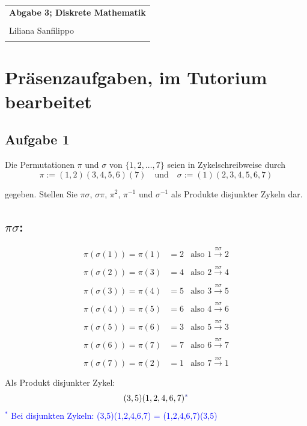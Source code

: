 \documentclass{article} %
\newcommand{\titulo}{Abgabe 3; Diskrete Mathematik}
\newcommand{\nombre}{Liliana Sanfilippo}
\begin{document}
\begin{tabular}{p{12cm}}
{{\Large\bf\titulo}}\\
\vspace{0.2cm}\\
 {\large\nombre}\\
 \vspace{0.2cm}\\   
\end{tabular}
\section{Präsenzaufgaben, im Tutorium bearbeitet}
\subsection{Aufgabe 1}
Die Permutationen $\pi$ und $\sigma$ von $\{1, 2, \dots, 7\}$ seien in Zykelschreibweise durch
    \[
    \pi := (1, 2)(3, 4, 5, 6)(7) \quad \text{und} \quad \sigma := (1)(2, 3, 4, 5, 6, 7) 
    \]
    
    gegeben. Stellen Sie $\pi\sigma$, $\sigma\pi$, $\pi^2$, $\pi^{-1}$ und $\sigma^{-1}$ als Produkte disjunkter Zykeln dar.
    \subsection*{$\pi\sigma$:}
    \begin{align*}
        \pi (\sigma (1)) = \pi (1) &  =2 & \text{also } 1 \xrightarrow[]{\pi \sigma} 2 \\
        \pi (\sigma (2)) = \pi (3) &  =4 & \text{also } 2 \xrightarrow[]{\pi \sigma} 4 \\
        \pi (\sigma (3)) = \pi (4) &  =5 & \text{also } 3 \xrightarrow[]{\pi \sigma} 5 \\
        \pi (\sigma (4)) = \pi (5) &  = 6& \text{also } 4 \xrightarrow[]{\pi \sigma} 6 \\
        \pi (\sigma (5)) = \pi (6) &  =3 & \text{also } 5 \xrightarrow[]{\pi \sigma} 3 \\
        \pi (\sigma (6)) = \pi (7) &  =7 & \text{also } 6 \xrightarrow[]{\pi \sigma} 7 \\
        \pi (\sigma (7)) = \pi (2) &  = 1& \text{also } 7 \xrightarrow[]{\pi \sigma} 1 \\
    \end{align*}
Als Produkt disjunkter Zykel: 
\[
(3,5)(1,2,4,6,7)\textcolor{Blue}{^*}
\]
\textcolor{Blue}{$^*$ Bei disjunkten Zykeln: (3,5)(1,2,4,6,7) = (1,2,4,6,7)(3,5)} \newline
\end{document}
